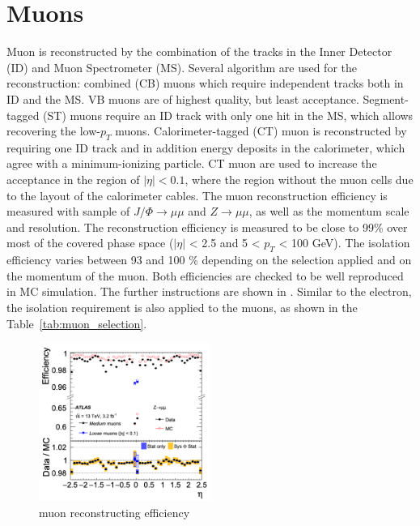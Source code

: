 \section{Muons}
Muon is reconstructed by the combination of the tracks in the Inner Detector (ID) and Muon Spectrometer (MS). Several algorithm are used for the reconstruction: combined (CB) muons which require independent tracks both in ID and the MS. VB muons are of highest quality, but least acceptance. Segment-tagged (ST) muons require an ID track with only one hit in the MS, which allows recovering the low-$p_T$ muons. Calorimeter-tagged (CT) muon is reconstructed by requiring one ID track and in addition energy deposits in the calorimeter, which agree with a minimum-ionizing particle. CT muon are used to increase the acceptance in the region of $|\eta| < 0.1$, where the region without the muon cells due to the layout of the calorimeter cables. 
The muon reconstruction efficiency is measured with sample of $J/\Phi \rightarrow \mu\mu$ and $Z\rightarrow \mu\mu$, as well as the momentum scale and resolution.
The reconstruction efficiency is measured to be close to 99\% over most of the covered phase space ($|\eta|$ < 2.5 and 5 < $p_{T}$ < 100 GeV). The isolation efficiency varies between 93 and 100 \% depending on the selection applied and on the momentum of the muon. Both efficiencies are checked to be well reproduced in MC simulation. 
The further instructions are shown in \cite{MUON-2018-03}.
Similar to the electron, the isolation requirement is also applied to the muons, as shown in the Table~\ref{tab:muon_selection}.
\begin{figure}[tbp]
\begin{center}
 \includegraphics[width=0.50\textwidth,keepaspectratio]{figures/recoMuon}
\caption{
muon reconstructing efficiency \cite{MUON-2018-03}
}
\label{fig:recoMuon}
\end{center}
\end{figure}
